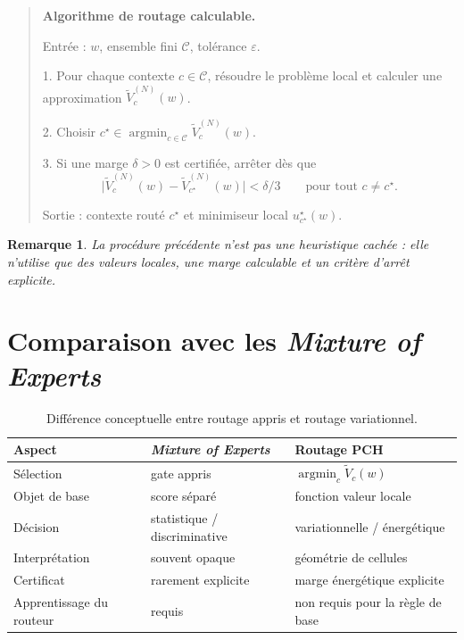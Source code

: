 \documentclass[11pt,a4paper]{article}
\newtheorem{remark}{Remarque}[section]
\DeclareMathOperator{\argmin}{argmin}
\newcommand{\Ccal}{\mathcal C}
\begin{document}
\begin{quote}
\small
\textbf{Algorithme de routage calculable.}

Entrée : \(w\), ensemble fini \(\Ccal\), tolérance \(\varepsilon\).

1. Pour chaque contexte \(c\in\Ccal\), résoudre le problème local et calculer une approximation \(\widetilde V_c^{(N)}(w)\).

2. Choisir \(c^\star\in\argmin_{c\in\Ccal}\widetilde V_c^{(N)}(w)\).

3. Si une marge \(\delta>0\) est certifiée, arrêter dès que
\[
\bigl|\widetilde V_c^{(N)}(w)-\widetilde V_{c^\star}^{(N)}(w)\bigr|<\delta/3
\qquad\text{pour tout }c\neq c^\star.
\]

Sortie : contexte routé \(c^\star\) et minimiseur local \(u_{c^\star}^\star(w)\).
\end{quote}

\begin{remark}
La procédure précédente n'est pas une heuristique cachée : elle n'utilise que des valeurs locales, une marge calculable et un critère d'arrêt explicite.
\end{remark}

\section{Comparaison avec les \emph{Mixture of Experts}}

\begin{table}[ht]
\centering
\begin{tabular}{@{}lll@{}}
\toprule
Aspect & \emph{Mixture of Experts} & Routage PCH \\
\midrule
Sélection & gate appris & \(\argmin_c \widetilde V_c(w)\) \\
Objet de base & score séparé & fonction valeur locale \\
Décision & statistique / discriminative & variationnelle / énergétique \\
Interprétation & souvent opaque & géométrie de cellules \\
Certificat & rarement explicite & marge énergétique explicite \\
Apprentissage du routeur & requis & non requis pour la règle de base \\
\bottomrule
\end{tabular}
\caption{Différence conceptuelle entre routage appris et routage variationnel.}
\end{table}
\end{document}
